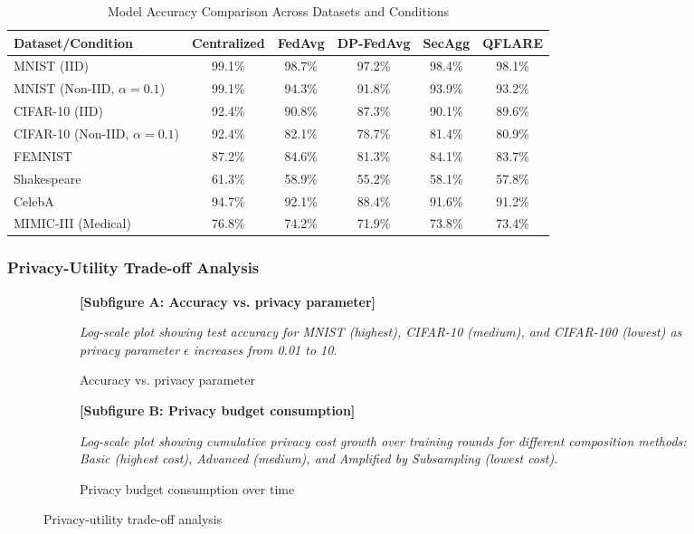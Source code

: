 \documentclass[journal,onecolumn]{IEEEtran}
\begin{document}
\begin{table}[htbp]
\centering
\caption{Model Accuracy Comparison Across Datasets and Conditions}
\begin{tabular}{|l|c|c|c|c|c|}
\hline
\textbf{Dataset/Condition} & \textbf{Centralized} & \textbf{FedAvg} & \textbf{DP-FedAvg} & \textbf{SecAgg} & \textbf{QFLARE} \\
\hline
MNIST (IID) & 99.1\% & 98.7\% & 97.2\% & 98.4\% & 98.1\% \\
MNIST (Non-IID, $\alpha=0.1$) & 99.1\% & 94.3\% & 91.8\% & 93.9\% & 93.2\% \\
CIFAR-10 (IID) & 92.4\% & 90.8\% & 87.3\% & 90.1\% & 89.6\% \\
CIFAR-10 (Non-IID, $\alpha=0.1$) & 92.4\% & 82.1\% & 78.7\% & 81.4\% & 80.9\% \\
FEMNIST & 87.2\% & 84.6\% & 81.3\% & 84.1\% & 83.7\% \\
Shakespeare & 61.3\% & 58.9\% & 55.2\% & 58.1\% & 57.8\% \\
CelebA & 94.7\% & 92.1\% & 88.4\% & 91.6\% & 91.2\% \\
MIMIC-III (Medical) & 76.8\% & 74.2\% & 71.9\% & 73.8\% & 73.4\% \\
\hline
\end{tabular}
\end{table}

\subsubsection{Privacy-Utility Trade-off Analysis}

\begin{figure}[htbp]
\centering
\begin{subfigure}{0.48\textwidth}
\textbf{[Subfigure A: Accuracy vs. privacy parameter]}

\textit{Log-scale plot showing test accuracy for MNIST (highest), CIFAR-10 (medium), and CIFAR-100 (lowest) as privacy parameter $\epsilon$ increases from 0.01 to 10.}
\caption{Accuracy vs. privacy parameter}
\end{subfigure}
\hfill
\begin{subfigure}{0.48\textwidth}
\textbf{[Subfigure B: Privacy budget consumption]}

\textit{Log-scale plot showing cumulative privacy cost growth over training rounds for different composition methods: Basic (highest cost), Advanced (medium), and Amplified by Subsampling (lowest cost).}
\caption{Privacy budget consumption over time}
\end{subfigure}
\caption{Privacy-utility trade-off analysis}
\end{figure}
\end{document}
